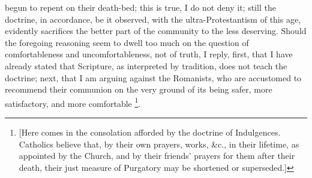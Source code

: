 begun to repent on their death-bed; this is true, I do not deny it;
still the doctrine, in accordance, be it observed, with the
ultra-Protestantism of this age, evidently sacrifices the better part
of the community to the less deserving. Should the foregoing reasoning
seem to dwell too much on the question of comfortableness and
uncomfortableness, not of truth, I reply, first, that I have already
stated that Scripture, as interpreted by tradition, does not teach the
doctrine; next, that I am arguing against the Romanists, who are
accustomed to recommend their communion on the very ground of its
being safer, more satisfactory, and more comfortable \footnote{[Here comes in the consolation afforded by the doctrine of
Indulgences. Catholics believe that, by their own prayers, works,
\&c., in their lifetime, as appointed by the Church, and by their
friends' prayers for them after their death, their just measure of
Purgatory may be shortened or superseded.]}.


